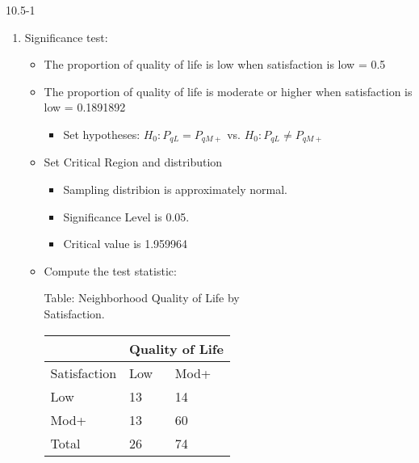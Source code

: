 \begin{exsol@solution}{10.5-1}

  \begin{enumerate}
	 \item Significance test:



\begin{itemize}

\item The proportion of quality of life is low when satisfaction is low = 0.5
\item The proportion of quality of life is moderate or higher when satisfaction is low = 0.1891892
  \begin{itemize}
  \item Set hypotheses: $H_0: P_{qL} = P_{qM+}$ vs. $H_0: P_{qL} \ne P_{qM+}$
  \end{itemize}

\item Set Critical Region and distribution

  \begin{itemize}
  \item Sampling distribion is approximately normal.
  \item Significance Level is 0.05.
  \item Critical value is 1.959964
  \end{itemize}

\item Compute the test statistic:

\begin{minipage}[ht]{6cm}

Table: Neighborhood Quality of Life by \\ Satisfaction.

      \begin{tabular}{@{} p{2.5cm} p{1cm} p{1cm} @{}} \hline %
     &  \multicolumn{2}{c}{ Quality of Life } \\ \hline
     Satisfaction   & Low & Mod+ \\ \hline
     Low           & 13 & 14 \\
     Mod+          & 13 & 60 \\ \hline
     Total         & 26 & 74 \\ \hline
   \end{tabular}


\end{minipage}
\end{itemize}
\end{enumerate}
\end{exsol@solution}

